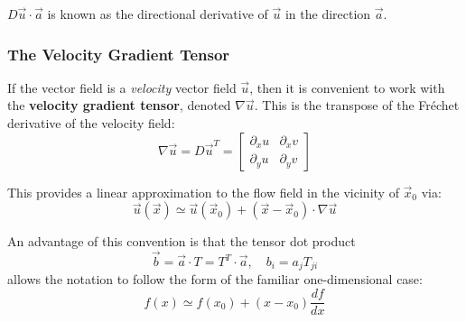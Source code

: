 \documentclass[a4paper]{report}
\begin{document}
$ D\vec{u} \cdot \vec{a}$ is known as the directional derivative of $\vec{u}$ in the direction $\vec{a}$.

\subsubsection*{The Velocity Gradient Tensor}
If the vector field is a \emph{velocity} vector field $\vec{u}$, then it is convenient to work with the \textbf{velocity gradient tensor}, denoted $\nabla \vec{u}$.  This is the transpose of the Fr\'{e}chet derivative of the velocity field:
\begin{equation}
\nabla \vec{u} = D\vec{u}^T = 
\begin{bmatrix}
\partial_x u & \partial_x v \\
\partial_y u & \partial_y v
\end{bmatrix}
\end{equation}

This provides a linear approximation to the flow field in the vicinity of $\vec{x}_0$ via:
\begin{equation}
\vec{u}(\vec{x}) \simeq \vec{u}(\vec{x}_0) + (\vec{x} - \vec{x}_0)\cdot \nabla \vec{u}
\end{equation}

\vspace{1em}

\begin{center}
\end{center}


An advantage of this convention is that the tensor dot product
\begin{equation}
\vec{b} = \vec{a} \cdot T = T^{T} \cdot \vec{a}, \quad b_i = a_j T_{ji}
\end{equation}
allows the notation to follow the form of the familiar one-dimensional case:
\begin{equation*}
f(x) \simeq f(x_0) + (x - x_0) \frac{df}{dx}
\end{equation*}
\end{document}
